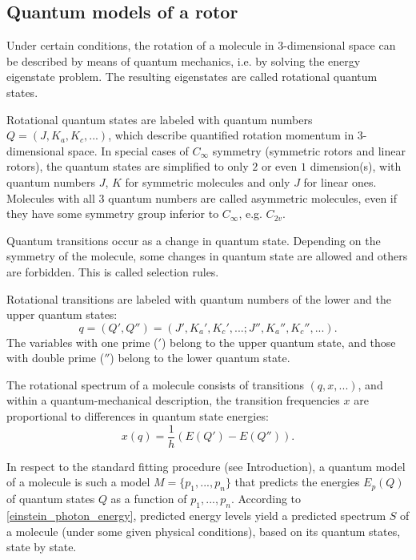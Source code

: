 \documentclass[11pt]{article}
\begin{document}
\subsection{Quantum models of a rotor}

Under certain conditions, the rotation of a molecule in $3$-dimensional space can be described by means of quantum mechanics, i.e. by solving the energy eigenstate problem. The resulting eigenstates are called rotational quantum states. 

Rotational quantum states are labeled with quantum numbers $Q = (J, {K_a}, {K_c}, ...)$, which describe quantified rotation momentum in $3$-dimensional space. In special cases of $C_{\infty}$ symmetry (symmetric rotors and linear rotors), the quantum states  are simplified to only $2$ or even $1$ dimension(s), with  quantum numbers $J$, $K$ for symmetric molecules and only $J$ for linear ones. Molecules with all $3$ quantum numbers are called asymmetric molecules, even if they have some symmetry group inferior to $C_{\infty}$, e.g. $C_{2v}$. 

Quantum transitions occur as a change in quantum state. Depending on the symmetry of the molecule, some changes in quantum state are allowed and others are forbidden. This is called selection rules.

Rotational transitions are labeled with quantum numbers of the lower and the upper quantum states:
\begin{equation} 
\label{quantum_numbers}
q = (Q', Q'') = (J', {K_a}', {K_c}', ...; J'', {K_a}'', {K_c}'', ...).
\end{equation}
The variables with one prime ($'$) belong to the upper quantum state, and those with double prime ($''$) belong to the lower quantum state. 

The rotational spectrum of a molecule consists of transitions $(q, x, ...)$, and within a quantum-mechanical description, the transition frequencies $x$ are proportional to differences in quantum state energies:
\begin{equation} 
\label{einstein_photon_energy}
 x(q) = \frac{1}{h}(E(Q') - E(Q'')).
\end{equation} 

In respect to the standard fitting procedure (see Introduction), a quantum model of a molecule is such a model $M = \{p_1, ..., p_n\}$ that predicts the energies $E_p(Q)$ of quantum states $Q$ as a function of $p_1, ..., p_n$. According to \ref{einstein_photon_energy}, predicted energy levels yield a predicted spectrum $S$ of a molecule (under some given physical conditions), based on its quantum states, state by state. 
\end{document}
